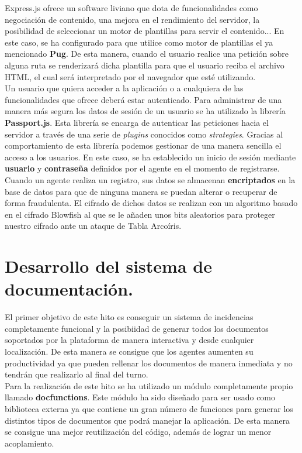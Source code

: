 Express.js ofrece un software liviano que dota de funcionalidades como negociación de contenido, una mejora en el 
rendimiento del servidor, la posibilidad de seleccionar un motor de plantillas para servir el contenido... En este caso,
se ha configurado para que utilice como motor de plantillas el ya mencionado \textbf{Pug}. De esta manera, cuando el usuario
realice una petición sobre alguna ruta se renderizará dicha plantilla para que el usuario reciba el archivo HTML, el cual
será interpretado por el navegador que esté utilizando.\\ 

Un usuario que quiera acceder a la aplicación o a cualquiera de las funcionalidades que ofrece deberá estar autenticado.
Para administrar de una manera más segura los datos de sesión de un usuario se ha utilizado la librería \textbf{Passport.js}\cite{passport}.
Esta librería se encarga de autenticar las peticiones hacia el servidor a través de una serie de \textit{plugins} conocidos
como \textit{strategies}. Gracias al comportamiento de esta librería podemos gestionar de una manera sencilla el acceso a los usuarios.
En este caso, se ha establecido un inicio de sesión mediante \textbf{usuario} y \textbf{contraseña} definidos por el agente en el 
momento de registrarse.\\

Cuando un agente realiza un registro, sus datos se almacenan \textbf{encriptados} en la base de datos para que de ninguna manera
se puedan alterar o recuperar de forma fraudulenta. El cifrado de dichos datos se realizan con un algoritmo basado en el cifrado
Blowfish\cite{blowfish} al que se le añaden unos bits aleatorios para proteger nuestro cifrado ante un ataque de Tabla Arcoíris\cite{rainbow}.


\section{Desarrollo del sistema de documentación.}

El primer objetivo de este hito es conseguir un sistema de incidencias completamente funcional y la posibiidad de generar todos los documentos
soportados por la plataforma de manera interactiva y desde cualquier localización. De esta manera se consigue que los agentes aumenten su 
productividad ya que pueden rellenar los documentos de manera inmediata y no tendrán que realizarlo al final del turno.\\

Para la realización de este hito se ha utilizado un módulo completamente propio llamado \textbf{doc\textunderscore functions}. Este módulo ha sido diseñado para ser usado
como biblioteca externa ya que contiene un gran número de funciones para generar los distintos tipos de documentos que podrá manejar la aplicación. De esta manera
se consigue una mejor reutilización del código, además de lograr un menor acoplamiento.\\

